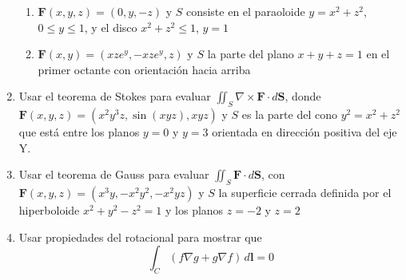 \documentclass{article}
\begin{document}
\begin{enumerate}
{            \begin{enumerate}
            \item{
                $\mathbf{F} (x,y,z) = (0,y,-z)$ y $S$ consiste en el paraoloide
                $y = x^2 + z^2$, $0 \leq y \leq 1$, y el disco
                $x^2 + z^2 \leq 1$, $y = 1$

			\color{azul}


            }

            \item{
            	$\mathbf{F} (x,y) = (xze^y,-xze^y,z)$ y $S$ la parte del plano $x + y+ z = 1$ en el primer octante con orientación hacia arriba

           \color{azul}

            }
            \end{enumerate}


        }

        \item {
            Usar el teorema de Stokes para evaluar $\displaystyle\iint_{S} \nabla \times \mathbf{F} \cdot d\mathbf{S}$, donde $\mathbf{F}(x,y,z) =(x^2y^3z,\sin(xyz),xyz)$ y $S$ es la parte del cono $y^2 = x^2 + z^2$ que está entre los planos $y = 0$ y $y = 3$ orientada en dirección positiva del eje Y.

            \color{azul}

        }

        \item {
            Usar el teorema de Gauss para evaluar $\displaystyle\iint_{S} \mathbf{F} \cdot d\mathbf{S}$, con $\mathbf{F}(x,y,z) = (x^3y,-x^2y^2,-x^2yz)$ y $S$ la superficie cerrada definida por el hiperboloide $x^2 + y^2 - z^2 = 1$ y los planos $z = -2$ y $z = 2$

            \color{azul}

        }

        \item {
            Usar propiedades del rotacional para mostrar que
            \[
                \int_C {{\left(f \nabla g + g \nabla f\right)}\,d\mathbf{l}} = 0
            \]


            \color{azul}

        }
    \end{enumerate}
\end{document}
